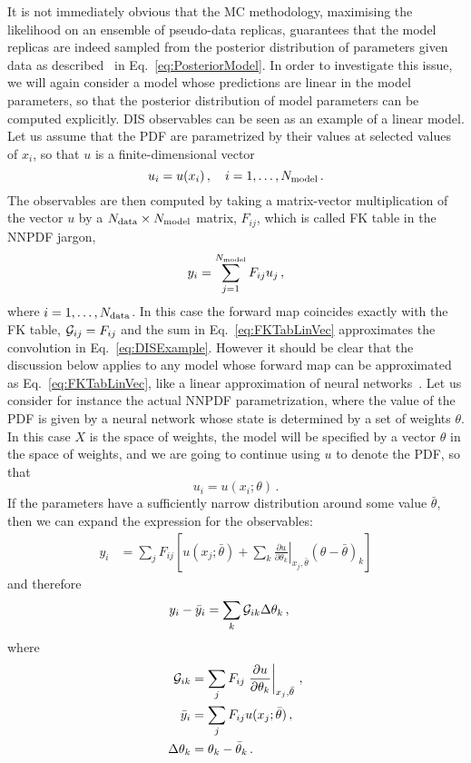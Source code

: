 It is not immediately obvious that the MC methodology, maximising the likelihood
on an ensemble of pseudo-data replicas, guarantees that the model replicas are
indeed sampled from the posterior distribution of parameters given data as
described \eg\ in Eq.~\ref{eq:PosteriorModel}. In order to investigate this
issue, we will again consider a model whose predictions are linear in the model
parameters, so that the posterior distribution of model parameters can be
computed explicitly. DIS observables can be seen as an example of a linear
model. Let us assume that the PDF are parametrized by their values at selected
values of $x_i$, so that $u$ is a finite-dimensional vector 
\begin{equation}
    \label{eq:Uvector}
    u_i = u(x_i)\, , \quad i = 1, \ldots, N_{\rm model}\, .    
\end{equation}
The observables are then computed by taking a matrix-vector multiplication of
the vector $u$ by a $N_{\rm data} \times N_{\rm model}$ matrix, $F_{ij}$, which is called FK
table in the NNPDF jargon, 
\begin{equation}
    \label{eq:FKTabLinVec}
    y_i = \sum_{j=1}^{N_{\rm model}} F_{ij} u_j\, ,
\end{equation}
where $i=1,\ldots,N_{\rm data}$. In this case the forward map coincides exactly with
the FK table, $\mathcal{G}_{ij} = F_{ij}$ and the sum in Eq.~\ref{eq:FKTabLinVec}
approximates the convolution in Eq.~\ref{eq:DISExample}. However it should be
clear that the discussion below applies to any model whose forward map can be
approximated as Eq.~\ref{eq:FKTabLinVec}, like a linear approximation of
neural networks~\cite{ADVANI2020428}. Let us consider for instance the actual
NNPDF parametrization, where the value of the PDF is given by a neural network
whose state is determined by a set of weights $\theta$. In this case $X$ is the
space of weights, the model will be specified by a vector $\theta$ in the space
of weights, and we are going to continue using $u$ to denote the PDF, so that 
\begin{equation}
    \label{eq:WeightsParam}
    u_i = u(x_i; \theta)\, .
\end{equation}
If the parameters have a sufficiently narrow distribution around some value
$\bar\theta$, then we can expand the expression for the observables:
\begin{align}
    y_i  &= 
        \sum_j F_{ij} \left[u(x_j; \bar\theta)
         + \sum_k \left.\frac{\partial u}{\partial \theta_k}\right|_{x_j,\bar\theta} 
         \left(\theta - \bar\theta\right)_k
        \right]
\end{align}
and therefore
\begin{align}
    y_i - \bar{y}_i &=
         \sum_k \mathcal{G}_{ik} \Delta\theta_k
        \,,         
\end{align}
where 
\begin{align}
    \mathcal{G}_{ik} &= 
        \sum_j F_{ij} \left.\frac{\partial u}{\partial \theta_k}\right|_{x_j,\bar\theta}\, , \\
    \bar{y}_i &= \sum_j F_{ij} u(x_j; \bar\theta)\, , \\
    \Delta\theta_k &= \theta_k - \bar\theta_k\, .
\end{align}

